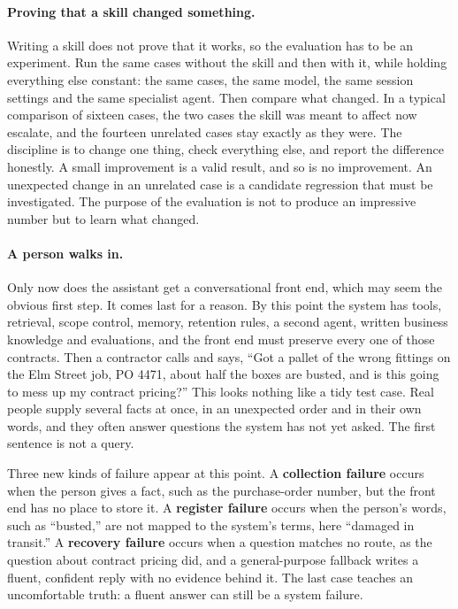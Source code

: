 \paragraph{Proving that a skill changed something.} Writing a skill does not prove that it works, so the evaluation has to be an experiment. Run the same cases without the skill and then with it, while holding everything else constant: the same cases, the same model, the same session settings and the same specialist agent. Then compare what changed. In a typical comparison of sixteen cases, the two cases the skill was meant to affect now escalate, and the fourteen unrelated cases stay exactly as they were. The discipline is to change one thing, check everything else, and report the difference honestly. A small improvement is a valid result, and so is no improvement. An unexpected change in an unrelated case is a candidate regression that must be investigated. The purpose of the evaluation is not to produce an impressive number but to learn what changed.

\paragraph{A person walks in.} Only now does the assistant get a conversational front end, which may seem the obvious first step. It comes last for a reason. By this point the system has tools, retrieval, scope control, memory, retention rules, a second agent, written business knowledge and evaluations, and the front end must preserve every one of those contracts. Then a contractor calls and says, ``Got a pallet of the wrong fittings on the Elm Street job, PO 4471, about half the boxes are busted, and is this going to mess up my contract pricing?'' This looks nothing like a tidy test case. Real people supply several facts at once, in an unexpected order and in their own words, and they often answer questions the system has not yet asked. The first sentence is not a query.

Three new kinds of failure appear at this point. A \textbf{collection failure} occurs when the person gives a fact, such as the purchase-order number, but the front end has no place to store it. A \textbf{register failure} occurs when the person's words, such as ``busted,'' are not mapped to the system's terms, here ``damaged in transit.'' A \textbf{recovery failure} occurs when a question matches no route, as the question about contract pricing did, and a general-purpose fallback writes a fluent, confident reply with no evidence behind it. The last case teaches an uncomfortable truth: a fluent answer can still be a system failure.

